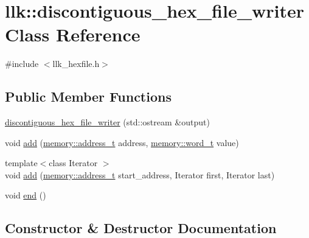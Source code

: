 \hypertarget{classllk_1_1discontiguous__hex__file__writer}{}\section{llk\+:\+:discontiguous\+\_\+hex\+\_\+file\+\_\+writer Class Reference}
\label{classllk_1_1discontiguous__hex__file__writer}


{\ttfamily \#include $<$llk\+\_\+hexfile.\+h$>$}

\subsection*{Public Member Functions}
\begin{DoxyCompactItemize}
\item 
\hyperlink{classllk_1_1discontiguous__hex__file__writer_a90e03c9ab8efd0c571fd53db27bcf386}{discontiguous\+\_\+hex\+\_\+file\+\_\+writer} (std\+::ostream \&output)
\item 
void \hyperlink{classllk_1_1discontiguous__hex__file__writer_a4dc35f2a9382c453d050d3e0ef8e1898}{add} (\hyperlink{classllk_1_1memory_ae7a4b897aa999f22e250dc8e4d773dec}{memory\+::address\+\_\+t} address, \hyperlink{classllk_1_1memory_a432a6c0ae1bcb9c44d79cfa1a239419c}{memory\+::word\+\_\+t} value)
\item 
{\footnotesize template$<$class Iterator $>$ }\\void \hyperlink{classllk_1_1discontiguous__hex__file__writer_abadd72236ae15b74466c96f058290657}{add} (\hyperlink{classllk_1_1memory_ae7a4b897aa999f22e250dc8e4d773dec}{memory\+::address\+\_\+t} start\+\_\+address, Iterator first, Iterator last)
\item 
void \hyperlink{classllk_1_1discontiguous__hex__file__writer_a7821a63136b422abdc17b8d9efdc1cf9}{end} ()
\end{DoxyCompactItemize}


\subsection{Constructor \& Destructor Documentation}
\mbox{\label{classllk_1_1discontiguous__hex__file__writer_a90e03c9ab8efd0c571fd53db27bcf386}} 
